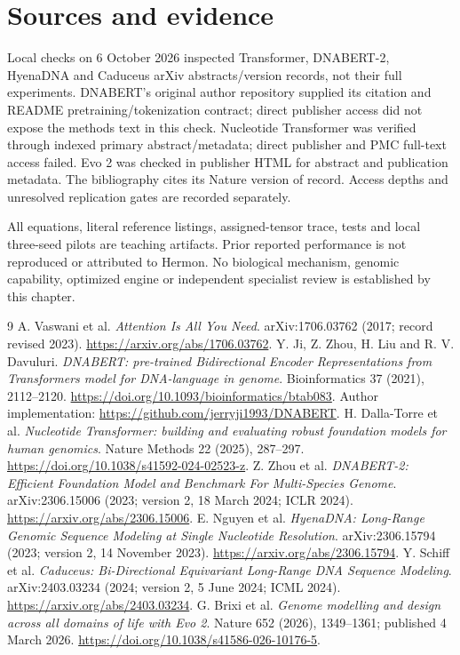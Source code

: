 \section*{Sources and evidence}
Local checks on 6 October 2026 inspected Transformer, DNABERT-2, HyenaDNA and
Caduceus arXiv abstracts/version records, not their full experiments.
DNABERT's original author repository supplied its citation and README
pretraining/tokenization contract; direct publisher access did not expose the
methods text in this check. Nucleotide Transformer was verified through indexed
primary abstract/metadata; direct publisher and PMC full-text access failed.
Evo 2 was checked in publisher HTML for abstract and publication metadata.
The bibliography cites its Nature version of record.
Access depths and unresolved replication gates are recorded separately.

All equations, literal reference listings, assigned-tensor trace, tests and local
three-seed pilots are teaching artifacts. Prior reported performance is not
reproduced or attributed to Hermon. No biological mechanism, genomic capability,
optimized engine or independent specialist review is established by this chapter.

\begin{thebibliography}{9}
 A. Vaswani et al. \emph{Attention Is All You Need}.
arXiv:1706.03762 (2017; record revised 2023).
\url{https://arxiv.org/abs/1706.03762}.
 Y. Ji, Z. Zhou, H. Liu and R. V. Davuluri.
\emph{DNABERT: pre-trained Bidirectional Encoder Representations from Transformers
model for DNA-language in genome}. Bioinformatics 37 (2021), 2112--2120.
\url{https://doi.org/10.1093/bioinformatics/btab083}.
Author implementation: \url{https://github.com/jerryji1993/DNABERT}.
 H. Dalla-Torre et al.
\emph{Nucleotide Transformer: building and evaluating robust foundation models
for human genomics}. Nature Methods 22 (2025), 287--297.
\url{https://doi.org/10.1038/s41592-024-02523-z}.
 Z. Zhou et al.
\emph{DNABERT-2: Efficient Foundation Model and Benchmark For Multi-Species Genome}.
arXiv:2306.15006 (2023; version 2, 18 March 2024; ICLR 2024).
\url{https://arxiv.org/abs/2306.15006}.
 E. Nguyen et al.
\emph{HyenaDNA: Long-Range Genomic Sequence Modeling at Single Nucleotide Resolution}.
arXiv:2306.15794 (2023; version 2, 14 November 2023).
\url{https://arxiv.org/abs/2306.15794}.
 Y. Schiff et al.
\emph{Caduceus: Bi-Directional Equivariant Long-Range DNA Sequence Modeling}.
arXiv:2403.03234 (2024; version 2, 5 June 2024; ICML 2024).
\url{https://arxiv.org/abs/2403.03234}.
 G. Brixi et al.
\emph{Genome modelling and design across all domains of life with Evo 2}.
Nature 652 (2026), 1349--1361; published 4 March 2026.
\url{https://doi.org/10.1038/s41586-026-10176-5}.
\end{thebibliography}
